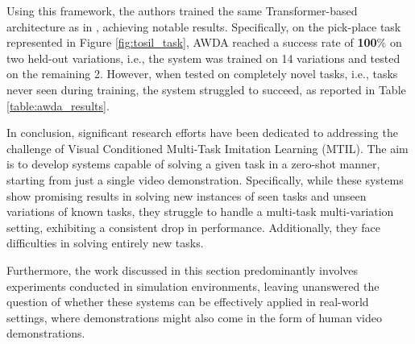 Using this framework, the authors trained the same Transformer-based architecture as in \cite{dasari2021transformers_one_shot}, achieving notable results. Specifically, on the pick-place task represented in Figure \ref{fig:tosil_task}, AWDA reached a success rate of \textbf{100}\% on two held-out variations, i.e., the system was trained on 14 variations and tested on the remaining 2. However, when tested on completely novel tasks, i.e., tasks never seen during training, the system struggled to succeed, as reported in Table \ref{table:awda_results}.


In conclusion, significant research efforts have been dedicated to addressing the challenge of Visual Conditioned Multi-Task Imitation Learning (MTIL). The aim is to develop systems capable of solving a given task in a zero-shot manner, starting from just a single video demonstration. Specifically, while these systems show promising results in solving new instances of seen tasks and unseen variations of known tasks, they struggle to handle a  multi-task multi-variation setting, exhibiting a consistent drop in performance. Additionally, they face difficulties in solving entirely new tasks.

Furthermore, the work discussed in this section predominantly involves experiments conducted in simulation environments, leaving unanswered the question of whether these systems can be effectively applied in real-world settings, where demonstrations might also come in the form of human video demonstrations.
